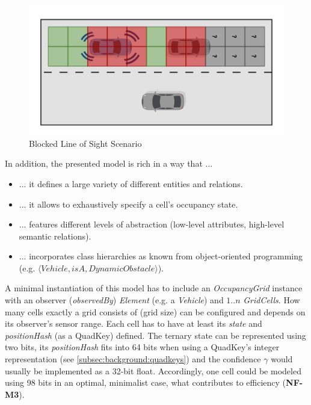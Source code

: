 \begin{figure}[h]
	\centering
	\includegraphics[width=0.7\linewidth]{98_images/unknown_cells_scene}
	\caption{Blocked Line of Sight Scenario}
	\label{fig:blocked_los_scenario}
\end{figure}


In addition, the presented model is rich in a way that ...

\begin{samepage}
	\begin{itemize}
		\item ... it defines a large variety of different entities and relations.
		\item ... it allows to exhaustively specify a cell's occupancy state.
		\item ... features different levels of abstraction (low-level attributes, high-level semantic relations).
		\item ... incorporates class hierarchies as known from object-oriented programming (e.g. $\langle Vehicle, isA, DynamicObstacle \rangle$).
	\end{itemize}
\end{samepage}

A minimal instantiation of this model has to include an \textit{OccupancyGrid} instance with an observer (\textit{observedBy}) \textit{Element} (e.g. a \textit{Vehicle}) and  $1..n$ \textit{GridCells}. How many cells exactly a grid consists of (grid size) can be configured and depends on its observer's sensor range. Each cell has to have at least its \textit{state} and \textit{positionHash} (as a QuadKey) defined. The ternary state can be represented using two bits, its \textit{positionHash} fits into 64 bits when using a QuadKey's integer representation (see \autoref{subsec:background:quadkeys}) and the confidence $\gamma$ would usually be implemented as a 32-bit float. Accordingly, one cell could be modeled using 98 bits in an optimal, minimalist case, what contributes to efficiency (\textbf{NF-M3}).


